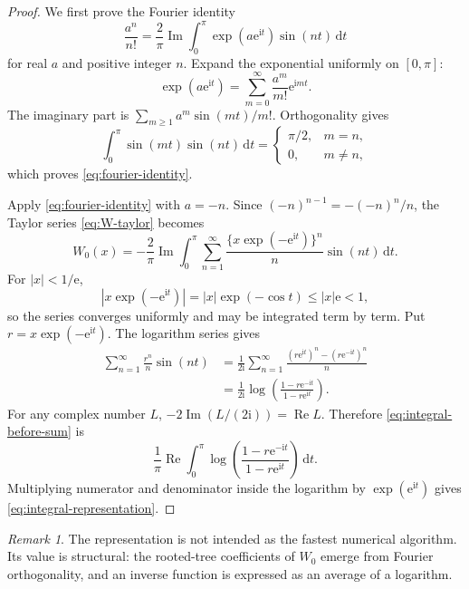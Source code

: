 \documentclass[11pt]{article}
\numberwithin{equation}{section}
\theoremstyle{definition}
\theoremstyle{remark}
\newtheorem{remark}[theorem]{Remark}
\newcommand{\e}{\mathrm e}
\newcommand{\ii}{\mathrm i}
\newcommand{\dd}{\,\mathrm d}
\begin{document}
\begin{proof}
We first prove the Fourier identity
\begin{equation}
 \frac{a^n}{n!}=\frac2\pi\operatorname{Im}
   \int_0^\pi \exp(a\e^{\ii t})\sin(nt)\dd t          \label{eq:fourier-identity}
\end{equation}
for real $a$ and positive integer $n$.  Expand the exponential uniformly on
$[0,\pi]$:
\[
 \exp(a\e^{\ii t})=\sum_{m=0}^{\infty}\frac{a^m}{m!}\e^{\ii mt}.
\]
The imaginary part is
$\sum_{m\ge1}a^m\sin(mt)/m!$.  Orthogonality gives
\[
 \int_0^\pi\sin(mt)\sin(nt)\dd t=
 \begin{cases}\pi/2,&m=n,\\0,&m\ne n,\end{cases}
\]
which proves \eqref{eq:fourier-identity}.

Apply \eqref{eq:fourier-identity} with $a=-n$.  Since
$(-n)^{n-1}=-(-n)^n/n$, the Taylor series
\eqref{eq:W-taylor} becomes
\begin{equation}
 W_0(x)=-\frac2\pi\operatorname{Im}\int_0^\pi
  \sum_{n=1}^{\infty}
    \frac{\{x\exp(-\e^{\ii t})\}^n}{n}\sin(nt)\dd t.  \label{eq:integral-before-sum}
\end{equation}
For $|x|<1/\e$,
\[
 \left|x\exp(-\e^{\ii t})\right|
 =|x|\exp(-\cos t)\le |x|\e<1,
\]
so the series converges uniformly and may be integrated term by term.  Put
$r=x\exp(-\e^{\ii t})$.  The logarithm series gives
\begin{align*}
 \sum_{n=1}^{\infty}\frac{r^n}{n}\sin(nt)
 &=\frac1{2\ii}\sum_{n=1}^{\infty}
     \frac{(r\e^{\ii t})^n-(r\e^{-\ii t})^n}{n}\\
 &=\frac1{2\ii}
   \log\!\left(\frac{1-r\e^{-\ii t}}{1-r\e^{\ii t}}\right).
\end{align*}
For any complex number $L$, $-2\operatorname{Im}(L/(2\ii))=
\operatorname{Re}L$.  Therefore \eqref{eq:integral-before-sum} is
\[
 \frac1\pi\operatorname{Re}\int_0^\pi
 \log\!\left(\frac{1-r\e^{-\ii t}}{1-r\e^{\ii t}}\right)\dd t.
\]
Multiplying numerator and denominator inside the logarithm by
$\exp(\e^{\ii t})$ gives \eqref{eq:integral-representation}.
\end{proof}

\begin{remark}
The representation is not intended as the fastest numerical algorithm.  Its
value is structural: the rooted-tree coefficients of $W_0$ emerge from
Fourier orthogonality, and an inverse function is expressed as an average of a
logarithm.
\end{remark}
\end{document}

